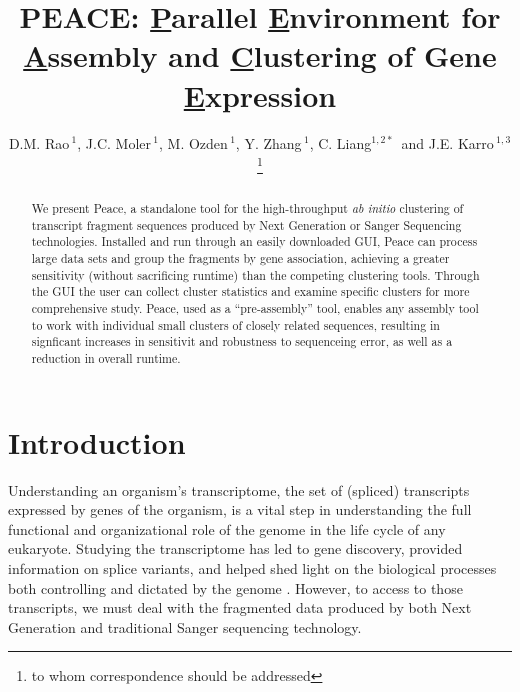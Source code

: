 \documentclass[a4,center,fleqn]{NAR}
\begin{document}
\title{PEACE: {\underline P}arallel {\underline E}nvironment for {\underline A}ssembly
  and {\underline C}lustering of Gene {\underline E}xpression}

\author{D.M. Rao\,$^{1}$, J.C. Moler\,$^{1}$, M. Ozden\,$^1$, Y. Zhang\,$^{1}$,
  C. Liang$^{1,2*}$\, and J.E. Karro\,$^{1,3}$\footnote{to whom
    correspondence should be addressed}}

\address{$^1$ Department of Computer Science and Software Engineering, \\
  $^2$ Department of Botany, \\
  $^3$ and Department of Microbiology, Miami University, Oxford, Ohio,
  USA}




\maketitle

\begin{abstract}
  We present {\sc Peace}, a standalone tool for the high-throughput
  {\it ab initio} clustering of transcript fragment sequences produced
  by Next Generation or Sanger Sequencing technologies.  Installed and
  run through an easily downloaded GUI, {\sc Peace} can process large
  data sets and group the fragments by gene association, achieving a
  greater sensitivity (without sacrificing runtime) than the competing
  clustering tools.  Through the GUI the user can collect
  cluster statistics and examine specific clusters for more
  comprehensive study.  {\sc Peace}, used as a ``pre-assembly'' tool,
  enables any assembly tool to work with individual small clusters of
  closely related sequences, resulting in signficant increases in
  sensitivit and robustness to sequenceing error, as well as a reduction in
  overall runtime.
\end{abstract}


\section{Introduction}

Understanding an organism's transcriptome, the set of (spliced)
transcripts expressed by genes of the organism, is a vital step in
understanding the full functional and organizational role of the
genome in the life cycle of any eukaryote.  Studying the transcriptome
has led to gene discovery, provided information on splice variants,  
and helped shed light on the biological processes both controlling and
dictated by the genome \cite{Nagaraj07}.  However, to access to those
transcripts, we must deal with the fragmented data produced by
both Next Generation and traditional Sanger sequencing technology.
\end{document}
